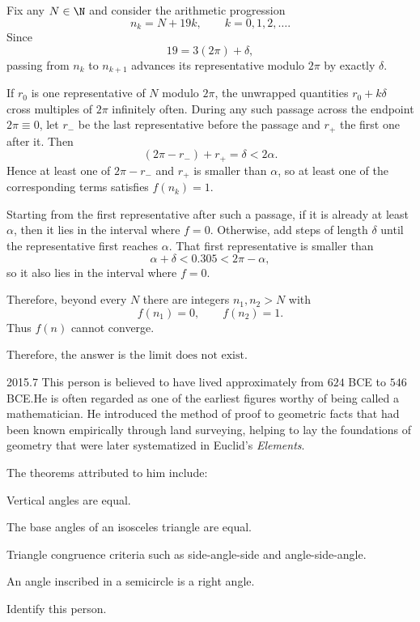 \begin{solutions}
\begin{solution}
            Fix any $N\in\N$ and consider the arithmetic progression
            \[
                n_k=N+19k,
                \qquad k=0,1,2,\dots.
            \]
            Since
            \[
                19=3(2\pi)+\delta,
            \]
            passing from $n_k$ to $n_{k+1}$ advances its representative modulo
            $2\pi$ by exactly $\delta$.

            If $r_0$ is one representative of $N$ modulo $2\pi$, the unwrapped
            quantities $r_0+k\delta$ cross multiples of $2\pi$ infinitely often.
            During any such passage across the endpoint $2\pi\equiv0$, let $r_-$ be
            the last representative before the passage and $r_+$ the first one after it.
            Then
            \[
                (2\pi-r_-)+r_+=\delta<2\alpha.
            \]
            Hence at least one of $2\pi-r_-$ and $r_+$ is smaller than $\alpha$,
            so at least one of the corresponding terms satisfies $f(n_k)=1$.

            Starting from the first representative after such a passage, if it is
            already at least $\alpha$, then it lies in the interval where $f=0$.
            Otherwise, add steps of length $\delta$ until the representative first
            reaches $\alpha$. That first representative is smaller than
            \[
                \alpha+\delta<0.305<2\pi-\alpha,
            \]
            so it also lies in the interval where $f=0$.

            Therefore, beyond every $N$ there are integers $n_1,n_2>N$ with
            \[
                f(n_1)=0,
                \qquad
                f(n_2)=1.
            \]
            Thus $f(n)$ cannot converge.

            Therefore, the answer is $\boxed{\text{the limit does not exist}}$.
        \end{solution}
    \end{solutions}

    \begin{pastproblem}{2015.7}
        This person is believed to have lived approximately from $624$ BCE to $546$ BCE.\@ He is
        often regarded as one of the earliest figures worthy of being called a mathematician. He
        introduced the method of proof to geometric facts that had been known empirically through
        land surveying, helping to lay the foundations of geometry that were later systematized in
        Euclid's \textit{Elements}.

        The theorems attributed to him include:
        \begin{problemchoices}
            \item Vertical angles are equal.
            \item The base angles of an isosceles triangle are equal.
            \item Triangle congruence criteria such as side-angle-side and angle-side-angle.
            \item An angle inscribed in a semicircle is a right angle.
        \end{problemchoices}
        Identify this person.
    \end{pastproblem}

